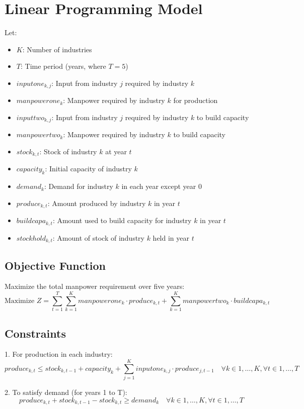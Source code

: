 \documentclass{article}
\begin{document}
\section*{Linear Programming Model}

Let:
\begin{itemize}
    \item $K$: Number of industries
    \item $T$: Time period (years, where $T = 5$)
    \item $inputone_{k, j}$: Input from industry $j$ required by industry $k$
    \item $manpowerone_{k}$: Manpower required by industry $k$ for production
    \item $inputtwo_{k, j}$: Input from industry $j$ required by industry $k$ to build capacity
    \item $manpowertwo_{k}$: Manpower required by industry $k$ to build capacity
    \item $stock_{k, t}$: Stock of industry $k$ at year $t$
    \item $capacity_{k}$: Initial capacity of industry $k$
    \item $demand_{k}$: Demand for industry $k$ in each year except year 0
    \item $produce_{k, t}$: Amount produced by industry $k$ in year $t$
    \item $buildcapa_{k, t}$: Amount used to build capacity for industry $k$ in year $t$
    \item $stockhold_{k, t}$: Amount of stock of industry $k$ held in year $t$
\end{itemize}

\subsection*{Objective Function}
Maximize the total manpower requirement over five years:
\[
\text{Maximize } Z = \sum_{t=1}^{T} \sum_{k=1}^{K} manpowerone_k \cdot produce_{k, t} + \sum_{k=1}^{K} manpowertwo_k \cdot buildcapa_{k, t}
\]

\subsection*{Constraints}
1. For production in each industry:
\[
produce_{k, t} \leq stock_{k, t-1} + capacity_k + \sum_{j=1}^{K} inputone_{k, j} \cdot produce_{j, t-1} \quad \forall k \in 1, \ldots, K, \forall t \in 1, \ldots, T
\]

2. To satisfy demand (for years 1 to T):
\[
produce_{k, t} + stock_{k, t-1} - stock_{k, t} \geq demand_k \quad \forall k \in 1, \ldots, K, \forall t \in 1, \ldots, T
\]
\end{document}
